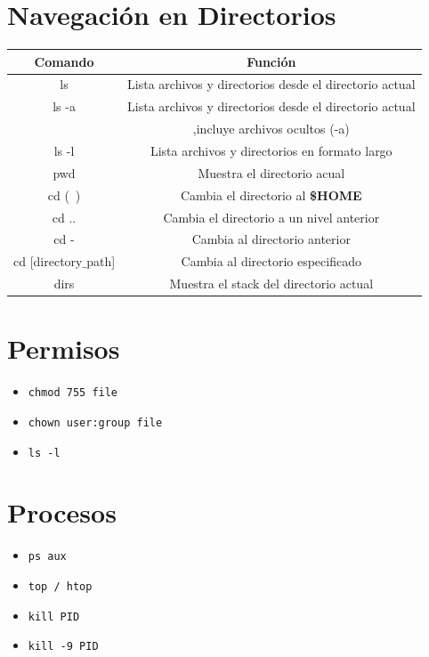 \documentclass[a4paper,10pt]{article}
\begin{document}
\section*{Navegación en Directorios}
    \begin{center}
        \begin{tabular}{| c | c |}
            \hline
            Comando & Función \\
            \hline\hline
            ls & Lista archivos y directorios desde el directorio actual \\
            \hline
            ls -a & Lista archivos y directorios desde el directorio actual \\ & ,incluye archivos ocultos (-a) \\
            \hline
            ls -l & Lista archivos y directorios en formato largo \\
            \hline
            pwd & Muestra el directorio acual \\
            \hline
            cd (~) & Cambia el directorio al \textbf{\$HOME} \\
            \hline
            cd .. & Cambia el directorio a un nivel anterior \\
            \hline
            cd - & Cambia al directorio anterior \\
            \hline
            cd [directory$\_$path] & Cambia al directorio especificado \\
            \hline
            dirs & Muestra el stack del directorio actual \\
            \hline
        \end{tabular}
    \end{center}

\section*{Permisos}
\begin{itemize}[leftmargin=*]
    \item \texttt{chmod 755 file}
    \item \texttt{chown user:group file}
    \item \texttt{ls -l}
\end{itemize}

\section*{Procesos}
\begin{itemize}[leftmargin=*]
    \item \texttt{ps aux}
    \item \texttt{top / htop}
    \item \texttt{kill PID}
    \item \texttt{kill -9 PID}
\end{itemize}
\end{document}
